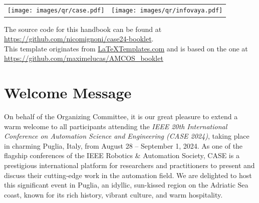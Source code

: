 \documentclass[
	openany, %
	parskip=full, %
	12pt, %
	a4paper, %
]{conferencebooklet} %
\begin{document}



\thispagestyle{empty} %

~\vfill %

\begin{center}
    \begin{tabular}{cc}
    	\texttt{[image: images/qr/case.pdf]} \hspace{20mm} & \texttt{[image: images/qr/infovaya.pdf]}
    \end{tabular}
\end{center}

\begin{center}	
    The source code for this handbook can be found at \url{https://github.com/nicomignoni/case24-booklet}. \\ This template originates from \url{LaTeXTemplates.com} and is based on the one at  \url{https://github.com/maximelucas/AMCOS\_booklet}
\end{center}

\newpage


\tableofcontents

\chapter{Welcome Message}
On behalf of the Organizing Committee, it is our great pleasure to extend a warm welcome to all participants attending the \textit{IEEE 20th International Conference on Automation Science and Engineering (CASE 2024)}, taking place in charming Puglia, Italy, from August 28 – September 1, 2024. As one of the flagship conferences of the IEEE Robotics \& Automation Society, CASE is a prestigious international platform for researchers and practitioners to present and discuss their cutting-edge work in the automation field. We are delighted to host this significant event in Puglia, an idyllic, sun-kissed region on the Adriatic Sea coast, known for its rich history, vibrant culture, and warm hospitality.
\end{document}
